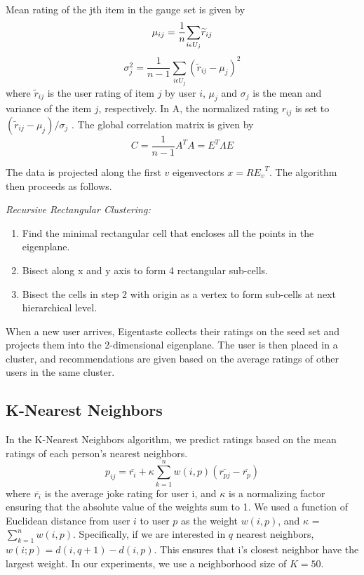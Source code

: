 \documentclass{article} %
\begin{document}
Mean rating of the jth item in the gauge set is given by
\begin{equation*}
\mu_{ij}=\frac{1}{n}{\sum_{i\epsilon U_{j}}}\widetilde{r}_{ij}\\
\end{equation*}
\begin{equation*}
\sigma_j^2=\frac{1}{n-1}{\sum_{i\epsilon U_{j}}}({\widetilde{r}_{ij}-\mu_{j}})^{2}
\end{equation*}
where $\widetilde{r}_{ij}$ is the user rating of item $j$ by user $i$, $\mu_{j}$ and $\sigma_j$ is the mean and variance of the item $j$, respectively. In A, the normalized rating $r_{ij}$ is set to
$({\widetilde{r}_{ij}-\mu_{j}})/\sigma _{j}$ . The global correlation
matrix is given by
\begin{equation*}
C=\frac{1}{n-1}A^{T}A=E^{T} \Lambda E
\end{equation*}

The data is projected along the first $v$ eigenvectors
$x=R{E_{v}}^{T}$. The algorithm then proceeds as follows.

\textit{Recursive Rectangular Clustering: }

\begin{enumerate}
\item Find the minimal rectangular cell that encloses all the points
  in the eigenplane.
\item Bisect along x and y axis to form 4 rectangular sub-cells.
\item Bisect the cells in step 2 with origin as a vertex to form
  sub-cells at next hierarchical level.
\end{enumerate}

When a new user arrives, Eigentaste collects their ratings on the seed
set and projects them into the 2-dimensional eigenplane. The user is
then placed in a cluster, and recommendations are given based on the
average ratings of other users in the same cluster.

\subsection{K-Nearest Neighbors}
In the K-Nearest Neighbors algorithm, we predict ratings based on the
mean ratings of each person's nearest neighbors.
\begin{equation*}
  p_{ij}=\overline{r_{i}}+\kappa\sum_{k=1}^n w(i,p)(\overline{r_{pj}}-\overline{r_{p}})
\end{equation*}
where $\overline{r_{i}}$ is the average joke rating for user i, and
$\kappa$ is a normalizing factor ensuring that the absolute value of
the weights sum to 1. We used a function of Euclidean distance from
user $i$ to user $p$ as the weight $w(i, p)$, and $\kappa$ =
$\sum_{k=1}^n w(i,p)$. Specifically, if we are interested in $q$
nearest neighbors, $w(i; p) = d(i, q +1)- d(i, p)$. This ensures that
i’s closest neighbor have the largest weight. In our experiments, we
use a neighborhood size of $K=50$.
\end{document}
